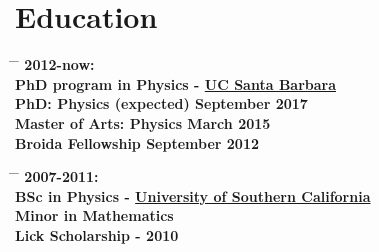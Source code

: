\documentclass[10pt]{article} %
\begin{document}
\section{Education}
\parbox{0.5\textwidth}{ %
\begin{tabbing}
\hspace{3cm} \= \hspace{4cm} \= \kill
\bf{2012-now:} \\
PhD program in Physics - \href{http://www.ucsb.edu}{UC Santa Barbara}\\[5pt]
\sqbullet\hspace{3mm}PhD: Physics (expected) \> \hspace{25mm}September 2017 \\
\sqbullet\hspace{3mm}Master of Arts: Physics \> \hspace{25mm}March \hspace{6mm} 2015 \\
\sqbullet\hspace{3mm}Broida Fellowship \> \hspace{25mm}September 2012
\end{tabbing}}
\hfill %
\parbox{0.5\textwidth}{ %
\begin{tabbing}
\hspace{3cm} \= \hspace{4cm} \= \kill
\bf{2007-2011:} \\
BSc in Physics - \href{http://www.usc.edu}{University of Southern California} \\[5pt]
\sqbullet\hspace{3mm}Minor in Mathematics\\
\sqbullet\hspace{3mm}Lick Scholarship - 2010
\end{tabbing}}

\end{document}
